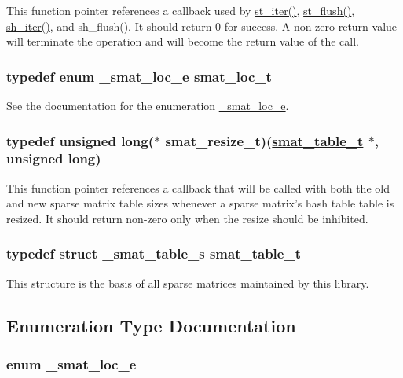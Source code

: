 This function pointer references a callback used by \hyperlink{group__dbprim__smat_a13}{st\_\-iter()}, \hyperlink{group__dbprim__smat_a14}{st\_\-flush()}, \hyperlink{group__dbprim__smat_a20}{sh\_\-iter()}, and sh\_\-flush(). It should return 0 for success. A non-zero return value will terminate the operation and will become the return value of the call. \hypertarget{group__dbprim__smat_a6}{
\subsubsection[smat\_\-loc\_\-t]{\setlength{\rightskip}{0pt plus 5cm}typedef enum \hyperlink{group__dbprim__smat_a47}{\_\-smat\_\-loc\_\-e} smat\_\-loc\_\-t}}
\label{group__dbprim__smat_a6}


See the documentation for the enumeration \hyperlink{group__dbprim__smat_a47}{\_\-smat\_\-loc\_\-e}. \hypertarget{group__dbprim__smat_a3}{
\subsubsection[smat\_\-resize\_\-t]{\setlength{\rightskip}{0pt plus 5cm}typedef unsigned long($\ast$ smat\_\-resize\_\-t)(\hyperlink{group__dbprim__smat_a0}{smat\_\-table\_\-t} $\ast$, unsigned long)}}
\label{group__dbprim__smat_a3}


This function pointer references a callback that will be called with both the old and new sparse matrix table sizes whenever a sparse matrix's hash table table is resized. It should return non-zero only when the resize should be inhibited. \hypertarget{group__dbprim__smat_a0}{
\subsubsection[smat\_\-table\_\-t]{\setlength{\rightskip}{0pt plus 5cm}typedef struct \_\-smat\_\-table\_\-s smat\_\-table\_\-t}}
\label{group__dbprim__smat_a0}


This structure is the basis of all sparse matrices maintained by this library. 

\subsection{Enumeration Type Documentation}
\hypertarget{group__dbprim__smat_a47}{
\subsubsection[\_\-smat\_\-loc\_\-e]{\setlength{\rightskip}{0pt plus 5cm}enum \_\-smat\_\-loc\_\-e}}
\label{group__dbprim__smat_a47}


